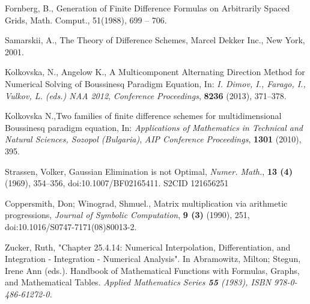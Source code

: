 \documentclass{article}
\begin{document}
\begin{thebibliography}{99}
Fornberg, B., Generation of Finite Difference Formulas on Arbitrarily Spaced Grids, 
Math. Comput., 51(1988),  699 -- 706.

 Samarskii, A., The Theory of Difference Schemes, Marcel Dekker Inc., New York, 2001.

 Kolkovska, N., Angelow K., A Multicomponent Alternating Direction Method for Numerical Solving of Boussinesq Paradigm Equation,
In: {\it  I. Dimov, I., Farago, I., Vulkov, L. (eds.) NAA 2012},
\emph{Conference Proceedings}, \textbf{8236} (2013), 371–378.

 Kolkovska N.,Two families of finite difference schemes for multidimensional Boussinesq paradigm equation, In:
{\it Applications of Mathematics in Technical and Natural Sciences,  Sozopol (Bulgaria)},
\emph{AIP Conference Proceedings}, \textbf{1301} (2010), 395.

Strassen, Volker, Gaussian Elimination is not Optimal,
{\it Numer. Math.}, \textbf{13 (4)} (1969), 354–356, doi:10.1007/BF02165411. S2CID 121656251

 Coppersmith, Don; Winograd, Shmuel., Matrix multiplication via arithmetic progressions,
{\it  Journal of Symbolic Computation}, \textbf{9 (3)} (1990), 251, doi:10.1016/S0747-7171(08)80013-2.

Zucker, Ruth, "Chapter 25.4.14: Numerical Interpolation, Differentiation, and Integration - Integration - Numerical Analysis". In Abramowitz, Milton; Stegun, Irene Ann (eds.). Handbook of Mathematical Functions with Formulas, Graphs, and Mathematical Tables. 
\it{Applied Mathematics Series} \textbf{55}  (1983), ISBN 978-0-486-61272-0.

\end{thebibliography}
\end{document}
